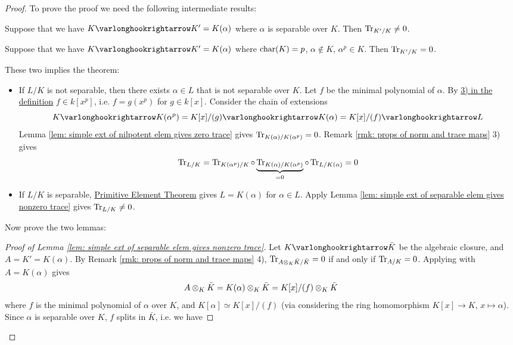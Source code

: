 \documentclass{article}
\begin{document}
\begin{proof}
    To prove the proof we need the following intermediate results:
    \begin{lemma}\label{lem: simple ext of separable elem gives nonzero trace}
        Suppose that we have $K \ext K' = K(\alpha)$ where $\alpha$ is separable over $K$. Then $\operatorname{Tr}_{K'/K} \neq 0$.
    \end{lemma}
    \nogap
    \begin{lemma}\label{lem: simple ext of nilpotent elem gives zero trace}
        Suppose that we have $K \ext K' = K(\alpha)$ where $\mathrm{char}(K) = p$, $\alpha \notin K$, $\alpha^p \in K$. Then $\operatorname{Tr}_{K'/K} = 0$.
    \end{lemma}
    These two implies the theorem:
    \begin{itemize}
        \item If $L/K$ is not separable, then there exists $\alpha \in L$ that is not separable over $K$. Let $f$ be the minimal polynomial of $\alpha$. By \hyperref[def: separable extension]{3) in the definition} $f \in k[x^p]$, i.e. $f = g(x^p)$ for $g \in k[x]$. Consider the chain of extensions
        \[
            K \ext K(\alpha^p) = K[x]/(g) \ext K(\alpha) = K[x]/(f) \ext L
        \]
        Lemma \ref{lem: simple ext of nilpotent elem gives zero trace} gives $\operatorname{Tr}_{K(\alpha)/K(\alpha^p)} = 0$. Remark \ref{rmk: props of norm and trace maps} 3) gives 
        \[
            \operatorname{Tr}_{L/K} = \operatorname{Tr}_{K(\alpha^p)/K} \circ \underbrace{\operatorname{Tr}_{K(\alpha)/K(\alpha^p)}}_{= 0} \circ \operatorname{Tr}_{L/K(\alpha)} = 0
        \]
        \item If $L/K$ is separable, \hyperref[thm: primitive element theorem]{Primitive Element Theorem} gives $L = K(\alpha)$ for $\alpha \in L$. Apply Lemma \ref{lem: simple ext of separable elem gives nonzero trace} gives $\operatorname{Tr}_{L/K} \neq 0$.
    \end{itemize}
    Now prove the two lemmas:
    \begin{proof}[Proof of Lemma \ref{lem: simple ext of separable elem gives nonzero trace}]
        Let $K \ext \bar{K}$ be the algebraic closure, and $A = K' = K(\alpha)$. By Remark \ref{rmk: props of norm and trace maps} 4), $\operatorname{Tr}_{A \otimes_K \bar{K}/\bar{K}} = 0$ if and only if $\operatorname{Tr}_{A/K} = 0$. Applying with $A = K(\alpha)$ gives
        \[
            A \otimes_K \bar{K} = K(\alpha) \otimes_K \bar{K} = K[x]/(f) \otimes_K\bar{K}
        \]
        where $f$ is the minimal polynomial of $\alpha$ over $K$, and $K[\alpha] \simeq K[x]/(f)$ (via considering the ring homomorphism $K[x] \to K$, $x \mapsto \alpha$). Since $\alpha$ is separable over $K$, $f$ splits in $\bar{K}$, i.e. we have

\end{proof}
\end{proof}
\end{document}
